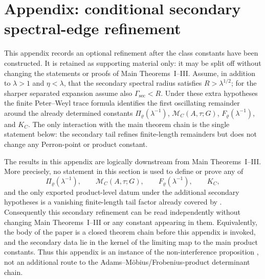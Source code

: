\section{Appendix: conditional secondary spectral-edge refinement}
\label{sec:secondary-term}

This appendix records an optional refinement after the class constants have
been constructed.  It is retained as supporting material only: it may be split
off without changing the statements or proofs of Main Theorems~I--III.  Assume,
in addition to \(\lambda>1\) and
\(\eta<\lambda\), that the secondary spectral radius satisfies
\(R>\lambda^{1/2}\); for the sharper separated expansion assume also
\(\Gamma_{\mathrm{sec}}<R\).  Under these extra hypotheses the finite
Peter--Weyl trace formula identifies the first oscillating remainder around
the already determined constants
\(\Pi_\varrho(\lambda^{-1})\), \(\mathcal M_C(A,\tau;G)\),
\(F_\varrho(\lambda^{-1})\), and \(K_C\).  The only interaction with the main
theorem chain is the single statement below: the secondary tail refines
finite-length remainders but does not change any Perron-point or product
constant.

\begin{proposition}
  \label{prop:secondary-spectral-edge-noninterference}
  The results in this appendix are logically downstream from Main
  Theorems~I--III.  More precisely, no statement in this section is used to
  define or prove any of
  \[
    \Pi_\varrho(\lambda^{-1}),\qquad
    \mathcal M_C(A,\tau;G),
    \qquad F_\varrho(\lambda^{-1}),
    \qquad K_C,
  \]
  and the only exported product-level datum under the additional secondary
  hypotheses is a vanishing finite-length tail factor already covered by
  .  Consequently this
  secondary refinement can be read independently without changing Main
  Theorems~I--III or any constant appearing in them.  Equivalently, the
  body of the paper is a closed theorem chain before this appendix is
  invoked, and the secondary data lie in the kernel of the limiting map to
  the main product constants.  Thus this appendix is an instance of the
  non-interference proposition
  , not an additional route to
  the Adams--M\"obius/Frobenius-product determinant chain.
\end{proposition}

